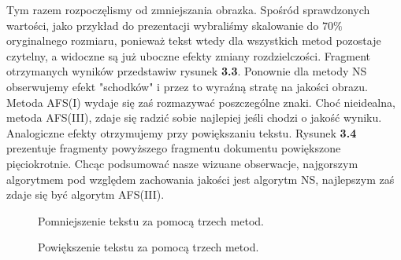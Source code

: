 Tym razem rozpoczęlismy od zmniejszania obrazka. Spośród sprawdzonych wartości,
jako przykład do prezentacji wybraliśmy skalowanie do $70\%$ oryginalnego
rozmiaru, ponieważ tekst wtedy dla wszystkich metod pozostaje czytelny, a
widoczne są już uboczne efekty zmiany rozdzielczości. Fragment otrzymanych
wyników przedstawiw rysunek \textbf{3.3}. Ponownie dla metody NS obserwujemy
efekt "schodków" i przez to wyraźną stratę na jakości obrazu. Metoda AFS(I)
wydaje się zaś rozmazywać poszczególne znaki. Choć nieidealna, metoda AFS(III),
zdaje się radzić sobie najlepiej jeśli chodzi o jakość wyniku. Analogiczne efekty
otrzymujemy przy powiększaniu tekstu. Rysunek \textbf{3.4} prezentuje
fragmenty powyższego fragmentu dokumentu powiększone pięciokrotnie. Chcąc
podsumować nasze wizuane obserwacje, najgorszym algorytmem pod względem zachowania
jakości jest algorytm NS, najlepszym zaś zdaje się być algorytm AFS(III).
\begin{figure}[h!tb]
\begin{center}
\caption{Pomniejszenie tekstu za pomocą trzech metod.}
\end{center}
\end{figure}
\begin{figure}[h!tb]
\begin{center}
\caption{Powiększenie tekstu za pomocą trzech metod.}
\end{center}
\end{figure}







